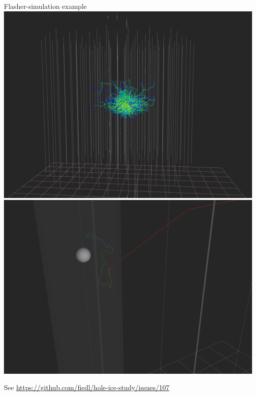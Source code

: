 \begin{frame}{Flasher-simulation example}
  \includegraphics[height=0.35\textheight]{img/flasher-steamshovel-total}\hspace{3mm}
  \includegraphics[height=0.35\textheight]{img/flasher-steamshovel-single-received-photon}

  \tiny{See \url{https://github.com/fiedl/hole-ice-study/issues/107}}

\end{frame}
